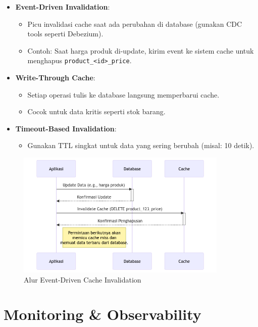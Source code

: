 \documentclass[11pt, a4paper]{book}
\begin{document}
	\begin{itemize}
		\item \textbf{Event-Driven Invalidation}:  
		\begin{itemize}
			\item Picu invalidasi cache saat ada perubahan di database (gunakan CDC tools seperti Debezium).  
			\item Contoh: Saat harga produk di-update, kirim event ke sistem cache untuk menghapus \texttt{product\_<id>\_price}.  
		\end{itemize}
		
		\item \textbf{Write-Through Cache}:  
		\begin{itemize}
			\item Setiap operasi tulis ke database langsung memperbarui cache.  
			\item Cocok untuk data kritis seperti stok barang.  
		\end{itemize}
		
		\item \textbf{Timeout-Based Invalidation}:  
		\begin{itemize}
			\item Gunakan TTL singkat untuk data yang sering berubah (misal: 10 detik).  
		\end{itemize}
	\end{itemize}
	
	\begin{figure}[htbp]
		\centering
		\includegraphics[width=0.9\textwidth]{images/cache-invalidation-sequence.png}
		\caption{Alur Event-Driven Cache Invalidation}
		\label{fig:invalidation-flow}
	\end{figure}
	
	\section{Monitoring \& Observability}
	\label{sec:monitoring}
	
\end{document}

